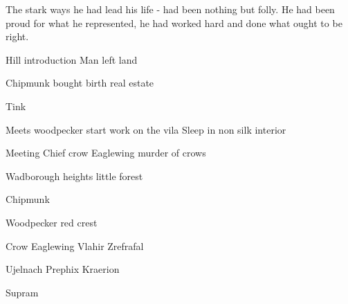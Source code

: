 \documentclass[smalldemyvopaper,11pt,twoside,onecolumn,openright,extrafontsizes]{memoir}
\begin{document}
The stark ways he had lead his life - had been nothing but folly. He had been proud for what he represented, he had worked hard and done what ought to be right. 

\newpage

\vspace*{4.3cm}
\begin{localsize}{10}
	\begin{quote}
	\end{quote} 
\end{localsize}
\vspace{1cm}


\newpage
 Hill introduction Man left land

 Chipmunk bought birth real estate
 
 Tink

 Meets woodpecker start work on the vila
 Sleep in non silk interior

Meeting Chief crow Eaglewing murder of crows

Wadborough heights little forest 

Chipmunk 

Woodpecker 
red crest

Crow Eaglewing
Vlahir
Zrefrafal

Ujelnach
Prephix
Kraerion

Supram

\end{document}
